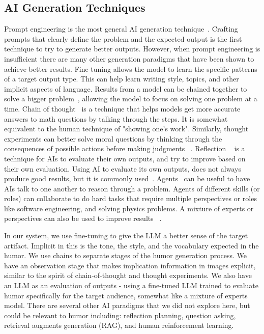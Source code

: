 



\subsection{AI Generation Techniques}

Prompt engineering is the most general AI generation technique~\cite{gpt2}. Crafting prompts that clearly define the problem and the expected output is the first technique to try to generate better outputs. However, when prompt engineering is insufficient there are many other generation paradigms that have been shown to achieve better results.
Fine-tuning allows the model to learn the specific patterns of a target output type. This can help learn writing style, topics, and other implicit aspects of language.
Results from a model can be chained together to solve a bigger problem~\cite{cai_ai_chains}, allowing the model to focus on solving one problem at a time. 
Chain of thought~\cite{cot} is a technique that helps models get more accurate answers to math questions by talking through the steps. It is somewhat equivalent to the human technique of "showing one's work". 
Similarly, thought experiments can better solve moral questions by thinking through the consequences of possible actions before making judgments ~\cite{ma2023letsthoughtexperimentusing}.
Reflection ~\cite{reflection} is a technique for AIs to evaluate their own outputs, and try to improve based on their own evaluation. 
Using AI to evaluate its own outputs, does not always produce good results, but it is commonly used~\cite{ai_self_eval}. 
Agents~\cite{joon_agents} can be useful to have AIs talk to one another to reason through a problem. Agents of different skills (or roles) can collaborate to do hard tasks that require multiple perspectives or roles like software engineering, and solving physics problems. A mixture of experts or perspectives can also be used to improve results ~\cite{cai2024surveymixtureexperts}.


In our system, we use fine-tuning to give the LLM a better sense of the target artifact. Implicit in this is the tone, the style, and the vocabulary expected in the humor. 
We use chains to separate stages of the humor generation process. We have an observation stage that makes implication information in images explicit, similar to the spirit of chain-of-thought and thought experiments. We also have an LLM as an evaluation of outputs - using a fine-tuned LLM trained to evaluate humor specifically for the target audience, somewhat like a mixture of experts model.
There are several other AI paradigms that we did not explore here, but could be relevant to humor including: reflection planning, question asking, retrieval augments generation (RAG), and human reinforcement learning. 



